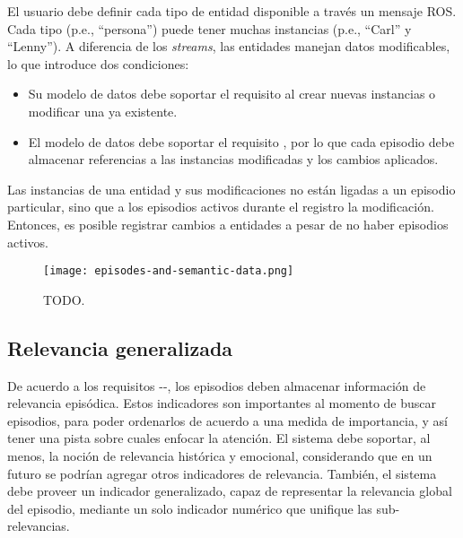 El usuario debe definir cada tipo de entidad disponible a través un mensaje ROS. Cada tipo (p.e., ``persona'') puede tener muchas instancias (p.e., ``Carl'' y ``Lenny''). A diferencia de los \textit{streams}, las entidades manejan datos modificables, lo que introduce dos condiciones:
\begin{itemize}
\item Su modelo de datos debe soportar el requisito  al crear nuevas instancias o modificar una ya existente.
\item El modelo de datos debe soportar el requisito , por lo que cada episodio debe almacenar referencias a las instancias modificadas y los cambios aplicados.
\end{itemize}

Las instancias de una entidad y sus modificaciones no están ligadas a un episodio particular, sino que a los episodios activos durante el registro la modificación. Entonces, es posible registrar cambios a entidades a pesar de no haber episodios activos.

\begin{figure}[!h]
	\centering
	\texttt{[image: episodes-and-semantic-data.png]}
	\caption{\small TODO.}
	\label{img:episodes-and-semantic-data}
\end{figure}


\subsection{Relevancia generalizada}

De acuerdo a los requisitos --, los episodios deben almacenar información de relevancia episódica. Estos indicadores son importantes al momento de buscar episodios, para poder ordenarlos de acuerdo a una medida de importancia, y así tener una pista sobre cuales enfocar la atención. El sistema debe soportar, al menos, la noción de relevancia histórica y emocional, considerando que en un futuro se podrían agregar otros indicadores de relevancia. También, el sistema debe proveer un indicador generalizado, capaz de representar la relevancia global del episodio, mediante un solo indicador numérico que unifique las sub-relevancias.

